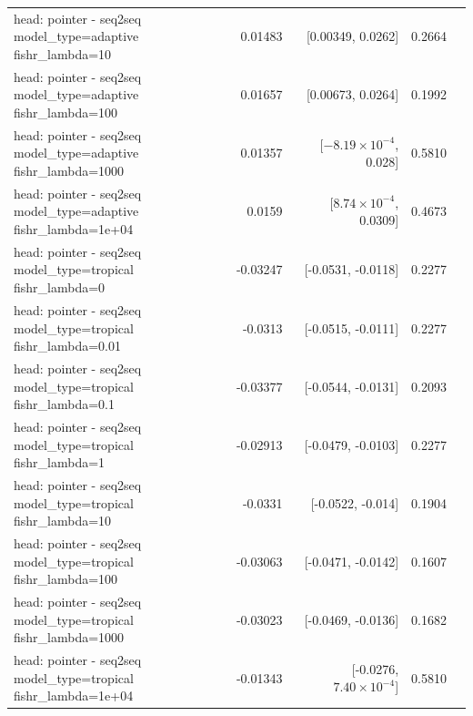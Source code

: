 \documentclass[10pt]{article}
\makeatletter
\newcommand{\stackcell}[1]{\begin{tabular}[t]{@{}l@{}}#1\end{tabular}}
\makeatother
\begin{document}
{\begin{longtable}{lrrrl}
\stackcell{head: pointer - seq2seq\\\footnotesize model\_type=adaptive fishr\_lambda=10 } & 0.01483 & [0.00349, 0.0262] & 0.2664 & \\
\stackcell{head: pointer - seq2seq\\\footnotesize model\_type=adaptive fishr\_lambda=100 } & 0.01657 & [0.00673, 0.0264] & 0.1992 & \\
\stackcell{head: pointer - seq2seq\\\footnotesize model\_type=adaptive fishr\_lambda=1000 } & 0.01357 & [$-8.19\times10^{-4}$, 0.028] & 0.5810 & \\
\stackcell{head: pointer - seq2seq\\\footnotesize model\_type=adaptive fishr\_lambda=1e+04 } & 0.0159 & [$8.74\times10^{-4}$, 0.0309] & 0.4673 & \\
\stackcell{head: pointer - seq2seq\\\footnotesize model\_type=tropical fishr\_lambda=0 } & -0.03247 & [-0.0531, -0.0118] & 0.2277 & \\
\stackcell{head: pointer - seq2seq\\\footnotesize model\_type=tropical fishr\_lambda=0.01 } & -0.0313 & [-0.0515, -0.0111] & 0.2277 & \\
\stackcell{head: pointer - seq2seq\\\footnotesize model\_type=tropical fishr\_lambda=0.1 } & -0.03377 & [-0.0544, -0.0131] & 0.2093 & \\
\stackcell{head: pointer - seq2seq\\\footnotesize model\_type=tropical fishr\_lambda=1 } & -0.02913 & [-0.0479, -0.0103] & 0.2277 & \\
\stackcell{head: pointer - seq2seq\\\footnotesize model\_type=tropical fishr\_lambda=10 } & -0.0331 & [-0.0522, -0.014] & 0.1904 & \\
\stackcell{head: pointer - seq2seq\\\footnotesize model\_type=tropical fishr\_lambda=100 } & -0.03063 & [-0.0471, -0.0142] & 0.1607 & \\
\stackcell{head: pointer - seq2seq\\\footnotesize model\_type=tropical fishr\_lambda=1000 } & -0.03023 & [-0.0469, -0.0136] & 0.1682 & \\
\stackcell{head: pointer - seq2seq\\\footnotesize model\_type=tropical fishr\_lambda=1e+04 } & -0.01343 & [-0.0276, $7.40\times10^{-4}$] & 0.5810 & \\

\end{longtable}}
\end{document}
